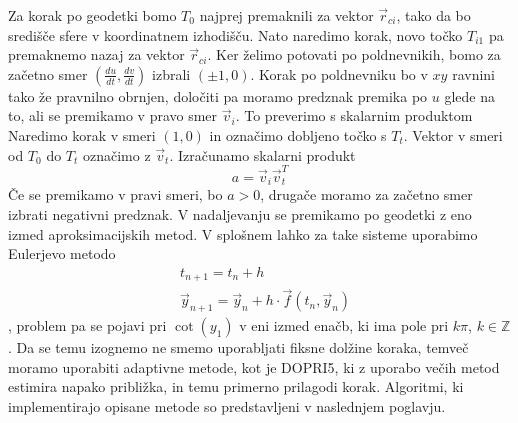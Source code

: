 \documentclass[titlepage]{article}
\begin{document}
Za korak po geodetki bomo $T_{0}$ najprej premaknili za vektor $\vec{r}_{ci}$, tako da bo središče sfere v koordinatnem izhodišču. Nato naredimo
korak, novo točko $T_{i1}$ pa premaknemo nazaj za vektor $\vec{r}_{ci}$.
Ker želimo potovati po poldnevnikih, bomo za začetno smer $\left( \frac{du}{dt}, \frac{dv}{dt} \right)$ izbrali $\left( \pm1, 0 \right)$. Korak po poldnevniku bo v $xy$ ravnini tako že pravnilno obrnjen, določiti pa moramo predznak premika po $u$ glede na to, ali se premikamo v pravo smer $\vec{v}_{i}$. To preverimo s skalarnim produktom
\bigskip
\newline
Naredimo korak v smeri $\left( 1, 0 \right)$ in označimo dobljeno točko s $T_{t}$. Vektor v smeri od $T_{0}$ do $T_{t}$ označimo z $\vec{v}_{t}$.
Izračunamo skalarni produkt
\begin{equation} \label{e:dirCorr}
    a= \vec{v}_{i} \vec{v}_{t}^T
\end{equation}
Če se premikamo v pravi smeri, bo $a > 0$, drugače moramo za začetno smer izbrati negativni predznak.
\bigskip
\newline
V nadaljevanju se premikamo po geodetki z eno izmed aproksimacijskih metod. V splošnem lahko za take sisteme uporabimo Eulerjevo metodo
\begin{equation} \label{e:euler}
    \begin{split}
        &t_{n+1}=t_{n}+h \\
        &\vec{y}_{n+1}=\vec{y}_{n}+h \cdot \vec{f}(t_{n}, \vec{y}_{n})
    \end{split}
\end{equation},
problem pa se pojavi pri $\cot(y_{1})$ v eni izmed enačb, ki ima pole pri
$k\pi$, $k \in \mathbb{Z}$. Da se temu izognemo ne smemo uporabljati fiksne dolžine koraka, temveč moramo uporabiti adaptivne metode, kot je DOPRI5,
ki z uporabo večih metod estimira napako približka, in temu primerno prilagodi korak.
\bigskip
\newline
Algoritmi, ki implementirajo opisane metode so predstavljeni v naslednjem poglavju.
\newpage
\end{document}
